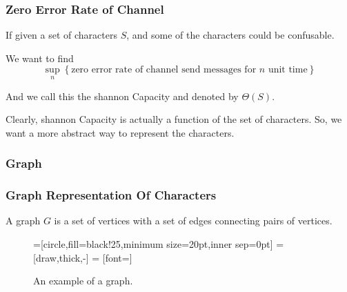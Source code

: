       \begin{frame}
            \frametitle{Zero Error Rate of Channel}
            If given a set of characters $S$, and some of the characters could be confusable.

            We want to find
            \begin{equation}
                  \sup_{n} \left\{
                        \text{zero error rate of channel send messages for $n$ unit time}
                  \right\}
            \end{equation}

            And we call this the shannon Capacity and denoted by $\Theta(S)$.

            Clearly, shannon Capacity is actually a function of the set of characters. So, we want a more abstract way to represent the characters.
      \end{frame}

\subsubsection*{Graph}

\begin{frame}
      \frametitle{Graph Representation Of Characters}
      \begin{definition}[graph] \label{def:graph}
            A graph $ G $ is a set of vertices with a set of edges connecting pairs of vertices.

            \begin{figure}[h!]
                  =[circle,fill=black!25,minimum size=20pt,inner sep=0pt]
                   = [draw,thick,-]
                   = [font=\small]
                  \label{fig:graphDefinitionExample}
                  \caption{An example of a graph.}
            \end{figure}
      \end{definition}
\end{frame}

